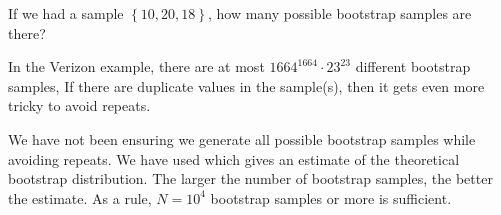 \vfill


\bb[resume]
\ii If we had a sample $\left\{ 10,  20 , 18 \right\}$, how many possible bootstrap samples are there? \vfill

\ee

In the Verizon example, there are at most $1664^{1664} \cdot 23^{23}$ different bootstrap samples, If there are
duplicate values in the sample(s), then it gets even more tricky to avoid repeats.

\bbox
\bi
\ii We have not been ensuring we generate all possible bootstrap samples while avoiding repeats.
\ii We have used \textbf{} which gives an estimate of the theoretical bootstrap distribution.
\ii The larger the number of bootstrap samples, the better the estimate. As a rule, $N=10^4$ bootstrap samples or more is sufficient.
\ei
\ebox
